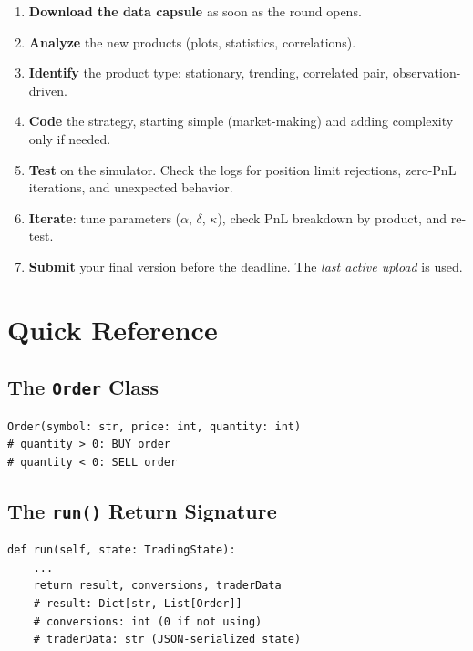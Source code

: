 \documentclass[11pt, letterpaper]{article}
\begin{document}
\begin{enumerate}
    \item \textbf{Download the data capsule} as soon as the round opens.
    \item \textbf{Analyze} the new products (plots, statistics, correlations).
    \item \textbf{Identify} the product type: stationary, trending, correlated pair, observation-driven.
    \item \textbf{Code} the strategy, starting simple (market-making) and adding complexity only if needed.
    \item \textbf{Test} on the simulator. Check the logs for position limit rejections, zero-PnL iterations, and unexpected behavior.
    \item \textbf{Iterate}: tune parameters ($\alpha$, $\delta$, $\kappa$), check PnL breakdown by product, and re-test.
    \item \textbf{Submit} your final version before the deadline. The \emph{last active upload} is used.
\end{enumerate}


\section{Quick Reference}

\subsection{The \texttt{Order} Class}

\begin{lstlisting}
Order(symbol: str, price: int, quantity: int)
# quantity > 0: BUY order
# quantity < 0: SELL order
\end{lstlisting}

\subsection{The \texttt{run()} Return Signature}

\begin{lstlisting}
def run(self, state: TradingState):
    ...
    return result, conversions, traderData
    # result: Dict[str, List[Order]]
    # conversions: int (0 if not using)
    # traderData: str (JSON-serialized state)
\end{lstlisting}
\end{document}
